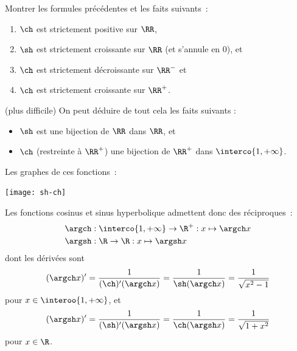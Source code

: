 \begin{frame}
  \begin{exercise}
    Montrer les formules précédentes et les faits suivants~:\pause{}
    \begin{enumerate}
    \item \(\ch\) est strictement positive sur \(\RR\),\pause{}
    \item \(\sh\) est strictement croissante sur \(\RR\) (et s'annule en \(0\)), et\pause{}
    \item \(\ch\) est strictement décroissante sur \(\RR^{-}\) et\pause{}
    \item \(\ch\) est strictement croissante sur \(\RR^{+}\).
    \end{enumerate}\pause{}
  \end{exercise}

  \begin{exercise} (plus difficile) On peut déduire de tout cela les faits suivants :
    \begin{itemize}
    \item \(\sh\) est une bijection de \(\RR\) dans \(\RR\), et
    \item \(\ch\) (restreinte à \(\RR^{+}\)) une bijection de \(\RR^{+}\) dans \(\interco{1,+\infty}\).
    \end{itemize}
  \end{exercise}
\end{frame}
\begin{frame}
  Les graphes de ces fonctions~:\pause{}
  \begin{center}%
    \texttt{[image: sh-ch]}
  \end{center}
\end{frame}
\begin{center}
\end{center}
\begin{frame}
  Les fonctions cosinus et sinus hyperbolique admettent donc des réciproques~:
  \begin{align*}
    \argch &: \interco{1,+\infty} \to \R^{+} : x \mapsto \argch x\\
    \argsh &: \R \to \R : x \mapsto \argsh x
  \end{align*}\pause{}
  dont les dérivées sont\pause{}
  \begin{equation*}
    (\argch x)' = \frac{1}{(\ch)'(\argch x)} = \frac{1}{\sh(\argch x)} = \frac{1}{\sqrt{x^2-1}}
  \end{equation*}
  pour $x \in \interoo{1,+\infty}$, et\pause{}
  \begin{equation*}
    (\argsh x)' = \frac{1}{(\sh)'(\argsh x)} = \frac{1}{\ch(\argsh x)} = \frac{1}{\sqrt{1+x^2}}
  \end{equation*}
  pour $x \in \R$.\pause{}
\end{frame}
